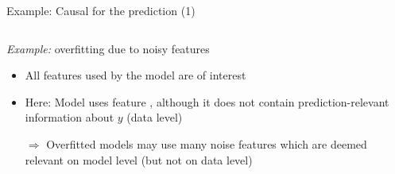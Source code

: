 \documentclass[11pt,compress,t,notes=noshow, aspectratio=169, xcolor=table]{beamer}
\begin{document}
\begin{frame}{Example: Causal for the prediction (1)}
\begin{columns}[T, totalwidth = \textwidth]
\begin{column}{0.5\linewidth}
  \textit{Example:} overfitting due to noisy features
  \pause
    \begin{itemize}
      \item All features used by the model are of interest
      \item Here: Model uses feature , although it does not contain prediction-relevant information about $y$ (data level)
      \item[$\Rightarrow$] Overfitted models may use many noise features which are deemed relevant on model level (but not on data level)
  \end{itemize}
  \end{column}
\end{columns}

\end{frame}



\end{document}
